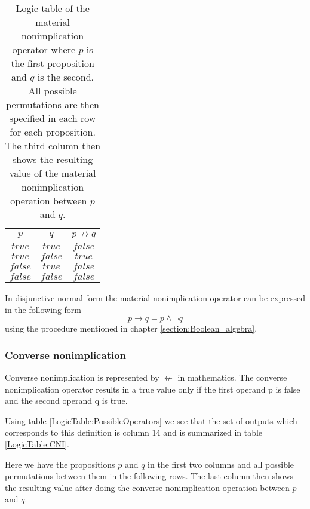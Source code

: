         \begin{table}[h!]
            \centering
            \begin{tabular}{|c|c|c|}
            	\hline
            	  $p$   &   $q$   & $p \not\rightarrow q$ \\ \hline
            	$true$  & $true$  &        $false$        \\ \hline
            	$true$  & $false$ &        $true$         \\ \hline
            	$false$ & $true$  &        $false$        \\ \hline
            	$false$ & $false$ &        $false$        \\ \hline
            \end{tabular}
            \caption{Logic table of the material nonimplication operator where $p$ is the first proposition and $q$ is the second. All possible permutations are then specified in each row for each proposition. The third column then shows the resulting value of the material nonimplication operation between $p$ and $q$.}
            \label{LogicTable:MNI}
        \end{table}
        
        In disjunctive normal form the material nonimplication operator can be expressed in the following form
        \begin{equation}
            p \rightarrow q = p \wedge \neg q 
        \end{equation}
        using the procedure mentioned in chapter \ref{section:Boolean_algebra}.
    
    \subsubsection{Converse nonimplication}
        Converse nonimplication is represented by $\not\leftarrow$ in mathematics. The converse nonimplication operator results in a true value only if the first operand p is false and the second operand q is true.
        
        Using table \ref{LogicTable:PossibleOperators} we see that the set of outputs which corresponds to this definition is column 14 and is summarized in table \ref{LogicTable:CNI}.
        
        Here we have the propositions $p$ and $q$ in the first two columns and all possible permutations between them in the following rows. The last column then shows the resulting value after doing the converse nonimplication operation between $p$ and $q$.
        
